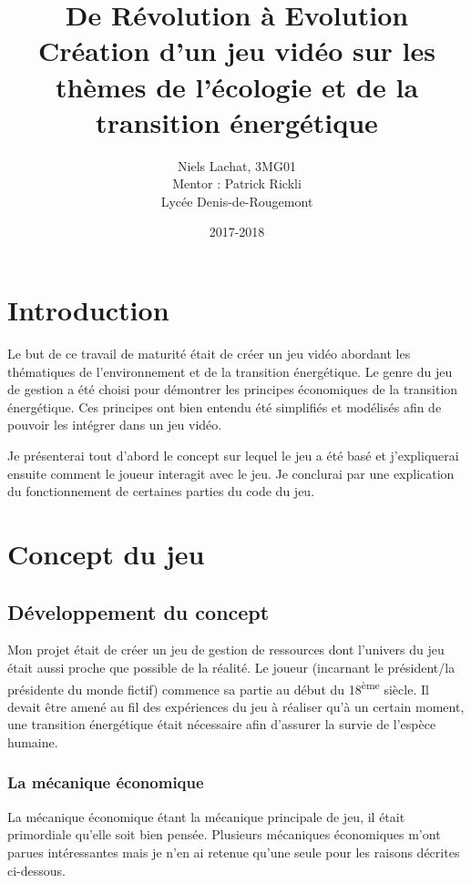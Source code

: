 \documentclass{article}
\title{De Révolution à Evolution \\ Création d'un jeu vidéo sur les thèmes de l'écologie et de la transition énergétique}
\date{2017-2018}
\author{Niels Lachat, 3MG01 \\ Mentor : Patrick Rickli \\ Lycée Denis-de-Rougemont}
\begin{document}
		

        \maketitle
        \newpage

        \tableofcontents
        \newpage

        \section{Introduction}
        Le but de ce travail de maturité était de créer un jeu vidéo abordant les thématiques de l'environnement et de la transition énergétique. 
        Le genre du jeu de gestion a été choisi pour démontrer les principes économiques de la transition énergétique.
        Ces principes ont bien entendu été simplifiés et modélisés afin de pouvoir les intégrer dans un jeu vidéo.
        
        
        Je présenterai tout d'abord le concept sur lequel le jeu a été basé et j'expliquerai ensuite comment le joueur interagit avec le jeu.
        Je conclurai par une explication du fonctionnement de certaines parties du code du jeu.

        \section{Concept du jeu}
        \subsection{Développement du concept}
        
        Mon projet était de créer un jeu de gestion de ressources dont l'univers du jeu était aussi proche que possible de la réalité. Le joueur (incarnant le président/la présidente du monde fictif) commence sa partie au début du 18\textsuperscript{ème} siècle. Il devait être amené au fil des expériences du jeu à réaliser qu'à un certain moment, une transition énergétique était nécessaire afin d'assurer la survie de l'espèce humaine.
        
        \subsubsection{La mécanique économique}
        La mécanique économique étant la mécanique principale de jeu, il était primordiale qu'elle soit bien pensée.
        Plusieurs mécaniques économiques m'ont parues intéressantes mais je n'en ai retenue qu'une seule pour les raisons décrites ci-dessous.
        
\end{document}
